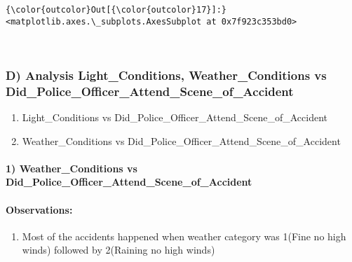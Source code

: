 \documentclass[11pt]{article}
\begin{document}
\begin{Verbatim}[commandchars=\\\{\}]
{\color{outcolor}Out[{\color{outcolor}17}]:} <matplotlib.axes.\_subplots.AxesSubplot at 0x7f923c353bd0>
\end{Verbatim}
            
    \begin{center}
    \end{center}
    { \hspace*{\fill} \\}
    
    \subsubsection{D) Analysis Light\_Conditions, Weather\_Conditions vs
Did\_Police\_Officer\_Attend\_Scene\_of\_Accident}\label{d-analysis-lightux5fconditions-weatherux5fconditions-vs-didux5fpoliceux5fofficerux5fattendux5fsceneux5fofux5faccident}

\begin{enumerate}
\def\labelenumi{\arabic{enumi})}
\itemsep1pt\parskip0pt
\item
  Light\_Conditions vs Did\_Police\_Officer\_Attend\_Scene\_of\_Accident
\item
  Weather\_Conditions vs
  Did\_Police\_Officer\_Attend\_Scene\_of\_Accident
\end{enumerate}

    \paragraph{1) Weather\_Conditions vs
Did\_Police\_Officer\_Attend\_Scene\_of\_Accident}\label{weatherux5fconditions-vs-didux5fpoliceux5fofficerux5fattendux5fsceneux5fofux5faccident}

\paragraph{Observations:}\label{observations}

\begin{enumerate}
\def\labelenumi{\arabic{enumi})}
\itemsep1pt\parskip0pt
\item
  Most of the accidents happened when weather category was 1(Fine no
  high winds) followed by 2(Raining no high winds)
\end{enumerate}
\end{document}
